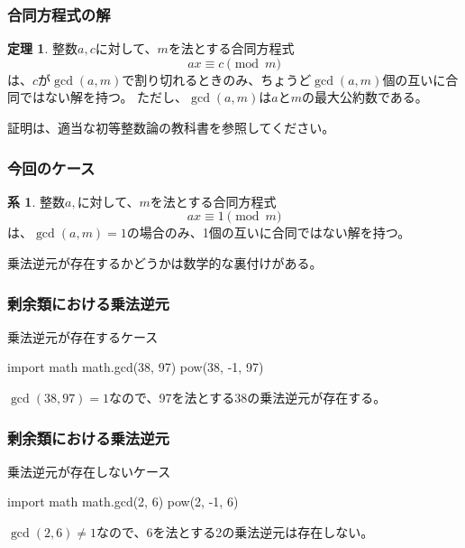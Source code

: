 \documentclass[aspectratio=169,dvipdfmx,14pt,notheorems]{beamer}
\theoremstyle{definition}
\newtheorem{theorem}{定理}
\newtheorem{corollary}{系}
\begin{document}
\begin{frame}[fragile]\frametitle{合同方程式の解}

\begin{theorem}
整数$a, c$に対して、$m$を法とする合同方程式
\begin{equation*}
ax \equiv c \pmod{m}
\end{equation*}
は、$c$が$\gcd(a, m)$で割り切れるときのみ、ちょうど$\gcd(a, m)$個の互いに合同ではない解を持つ。
ただし、$\gcd(a, m)$は$a$と$m$の最大公約数である。
\end{theorem}
証明は、適当な初等整数論の教科書を参照してください。
\end{frame}

\begin{frame}[fragile]\frametitle{今回のケース}

\begin{corollary}
整数$a,$に対して、$m$を法とする合同方程式
\begin{equation*}
ax \equiv 1 \pmod{m}
\end{equation*}
は、$\gcd(a, m) = 1$の場合のみ、1個の互いに合同ではない解を持つ。
\end{corollary}
乗法逆元が存在するかどうかは数学的な裏付けがある。
\end{frame}

\begin{frame}[fragile]\frametitle{剰余類における乗法逆元}

\begin{exampleblock}{乗法逆元が存在するケース}

\begin{pyconsole}
import math
math.gcd(38, 97)
pow(38, -1, 97)
\end{pyconsole}
\end{exampleblock}
$\gcd(38, 97) = 1$なので、97を法とする38の乗法逆元が存在する。
\end{frame}


\begin{frame}[fragile]\frametitle{剰余類における乗法逆元}

\begin{alertblock}{乗法逆元が存在しないケース}

\begin{pyconsole}
import math
math.gcd(2, 6)
pow(2, -1, 6)
\end{pyconsole}
\end{alertblock}
$\gcd(2, 6) \neq 1$なので、6を法とする2の乗法逆元は存在しない。
\end{frame}
\end{document}
